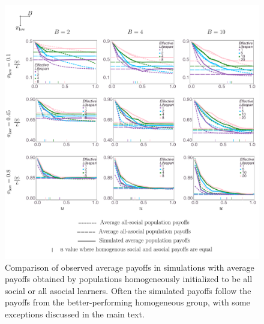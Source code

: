 \documentclass[letterpaper,11.5pt]{scrartcl}
\begin{document}
\clearpage
\begin{figure}
  \caption{Comparison of observed average payoffs in simulations with average payoffs
    obtained by populations homogeneously initialized to be all social or all asocial learners. Often the simulated payoffs follow the payoffs from the better-performing homogeneous group, with some exceptions discussed in the main text.}
  \label{fig:payoffs}
  \centering
    \includegraphics[width=\textwidth]{Figures/meanNetPayoffs.pdf}
\end{figure}
\end{document}
